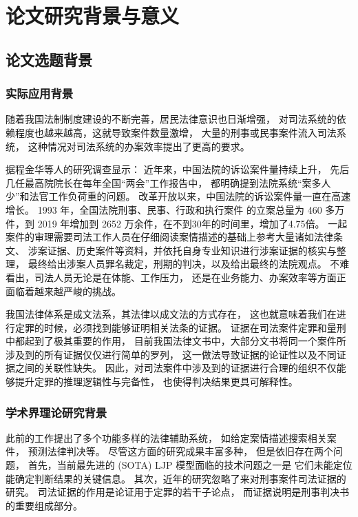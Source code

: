\section{论文研究背景与意义}

\subsection{论文选题背景}

\subsubsection{实际应用背景}
随着我国法制制度建设的不断完善，居民法律意识也日渐增强，
对司法系统的依赖程度也越来越高，这就导致案件数量激增，
大量的刑事或民事案件流入司法系统，
这种情况对司法系统的办案效率提出了更高的要求。

据程金华等人的研究调查显示：
近年来，中国法院的诉讼案件量持续上升，
先后几任最高院院长在每年全国“两会”工作报告中，
都明确提到法院系统“案多人少”和法官工作负荷重的问题。
改革开放以来，中国法院的诉讼案件量一直在高速增长。
1993 年，全国法院刑事、民事、行政和执行案件
的立案总量为 460 多万件，到 2019 年增加到 2652
万余件，在不到30年的时间里，增加了4.75倍。
一起案件的审理需要司法工作人员在仔细阅读案情描述的基础上参考大量诸如法律条文、
涉案证据、历史案件等资料，并依托自身专业知识进行涉案证据的核实与整理，
最终给出涉案人员罪名裁定，刑期的判决，以及给出最终的法院观点。
不难看出，司法人员无论是在体能、工作压力，
还是在业务能力、办案效率等方面正面临着越来越严峻的挑战。

我国法律体系是成文法系，其法律以成文法的方式存在，
这也就意味着我们在进行定罪的时候，必须找到能够证明相关法条的证据。
证据在司法案件定罪和量刑中都起到了极其重要的作用，
目前我国法律文书中，大部分文书将同一个案件所涉及到的所有证据仅仅进行简单的罗列，
这一做法导致证据的论证性以及不同证据之间的关联性缺失。
因此，对司法案件中涉及到的证据进行合理的组织不仅能够提升定罪的推理逻辑性与完备性，
也使得判决结果更具可解释性。

\subsubsection{学术界理论研究背景}


此前的工作提出了多个功能多样的法律辅助系统，
如给定案情描述搜索相关案件，
预测法律判决等。
尽管这方面的研究成果丰富多种，
但是依旧存在两个问题，
首先，当前最先进的 (SOTA) LJP 模型面临的技术问题之一是
它们未能定位能确定判断结果的关键信息。
其次，近年的研究忽略了来对刑事案件司法证据的研究。
司法证据的作用是论证用于定罪的若干子论点，
而证据说明是刑事判决书的重要组成部分。

